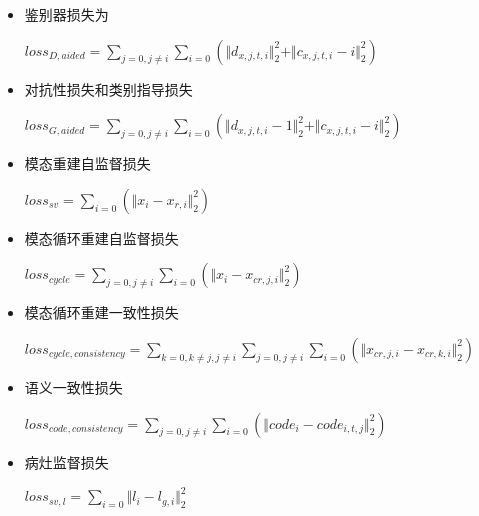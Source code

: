\documentclass[letterpaper]{article} %
\begin{document}
\begin{itemize}
	\item 鉴别器损失为

\begin{center}
	$loss_{D,aided}=\sum\limits_{j=0,j\neq i}\sum\limits_{i=0}(\Vert{d_{x,j,t,i}}\Vert_{2}^{2}+\Vert{c_{x,j,t,i}-i}\Vert_{2}^{2})$
\end{center}

	\item 对抗性损失和类别指导损失

\begin{center}
	$loss_{G,aided}=\sum\limits_{j=0,j\neq i}\sum\limits_{i=0}(\Vert{d_{x,j,t,i}-1}\Vert_{2}^{2}+\Vert{c_{x,j,t,i}-i}\Vert_{2}^{2})$
\end{center}

	\item 模态重建自监督损失
	
\begin{center}
	$loss_{sv}=\sum\limits_{i=0}(\Vert{x_i-x_{r,i}}\Vert_{2}^{2})$
\end{center}

	\item 模态循环重建自监督损失

\begin{center}
	$loss_{cycle}=\sum\limits_{j=0,j\neq i}\sum\limits_{i=0}(\Vert{x_i-x_{cr,j,i}}\Vert_{2}^{2})$
\end{center}

	\item 模态循环重建一致性损失

\begin{center}
	$loss_{cycle,consistency}=\sum\limits_{k=0,k\neq j,j\neq i}\sum\limits_{j=0,j\neq i}\sum\limits_{i=0}(\Vert{x_{cr,j,i}-x_{cr,k,i}}\Vert_{2}^{2})$
\end{center}

	\item 语义一致性损失

\begin{center}
	$loss_{code,consistency}=\sum\limits_{j=0,j\neq i}\sum\limits_{i=0}(\Vert{code_i-code_{i,t,j}}\Vert_{2}^{2})$
\end{center}

	\item 病灶监督损失
	
\begin{center}
	$loss_{sv,l}=\sum\limits_{i=0}\Vert{l_i-l_{g,i}}\Vert_{2}^{2}$
\end{center}

\end{itemize}
\end{document}
